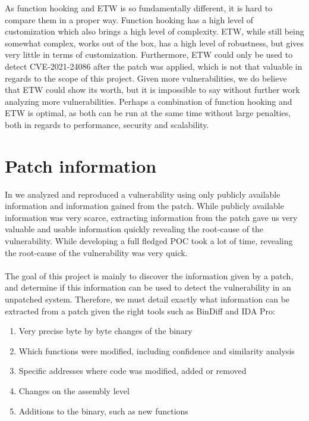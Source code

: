 \documentclass{report}
\begin{document}
As function hooking and \gls{ETW} is so fundamentally different, it is hard to compare them in a proper way. Function hooking has a high level of customization which also brings a high level of complexity. \gls{ETW}, while still being somewhat complex, works out of the box, has a high level of robustness, but gives very little in terms of customization. Furthermore, \gls{ETW} could only be used to detect CVE-2021-24086 after the patch was applied, which is not that valuable in regards to the scope of this project. Given more vulnerabilities, we do believe that \gls{ETW} could show its worth, but it is impossible to say without further work analyzing more vulnerabilities. Perhaps a combination of function hooking and \gls{ETW} is optimal, as both can be run at the same time without large penalties, both in regards to performance, security and scalability.

\section{Patch information}
In  we analyzed and reproduced a vulnerability using only publicly available information and information gained from the patch. While publicly available information was very scarce, extracting information from the patch gave us very valuable and usable information quickly revealing the root-cause of the vulnerability. While developing a full fledged \gls{POC} took a lot of time, revealing the root-cause of the vulnerability was very quick.
\\
\\
The goal of this project is mainly to discover the information given by a patch, and determine if this information can be used to detect the vulnerability in an unpatched system. Therefore, we must detail exactly what information can be extracted from a patch given the right tools such as BinDiff\cite{url:bindiff:homepage} and IDA Pro\cite{url:ida-pro:homepage}:

\begin{enumerate}
    \item Very precise byte by byte changes of the binary
    \item Which functions were modified, including confidence and similarity analysis
    \item Specific addresses where code was modified, added or removed
    \item Changes on the assembly level
    \item Additions to the binary, such as new functions
\end{enumerate}
\end{document}
